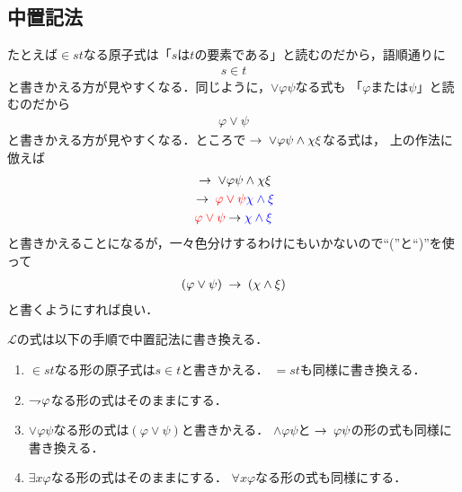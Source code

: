 \subsection{中置記法}
	たとえば$\in s t$なる原子式は「$s$は$t$の要素である」と読むのだから，語順通りに
	\begin{align}
		s \in t
	\end{align}
	と書きかえる方が見やすくなる．同じように，$\vee \varphi \psi$なる式も
	「$\varphi$または$\psi$」と読むのだから
	\begin{align}
		\varphi \vee \psi
	\end{align}
	と書きかえる方が見やすくなる．ところで$\hspace{0.25em}\rightarrow\hspace{0.25em} \vee \varphi \psi \wedge \chi \xi$なる式は，
	上の作法に倣えば
	\begin{align}
		\begin{gathered}
			\hspace{0.25em}\rightarrow\hspace{0.25em} \vee \varphi \psi \wedge \chi \xi \\
			\hspace{0.25em}\rightarrow\hspace{0.25em} \color{red}{\varphi \vee \psi} \color{blue}{\chi \wedge \xi} \\
			\color{red}{\varphi \vee \psi} \color{black}{\hspace{0.25em}\rightarrow\hspace{0.25em}} \color{blue}{\chi \wedge \xi}
		\end{gathered}
	\end{align}
	と書きかえることになるが，一々色分けするわけにもいかないので``(''と``)''を使って
	\begin{align}
		(\varphi \vee \psi) \hspace{0.25em}\rightarrow\hspace{0.25em} (\chi \wedge \xi)
	\end{align}
	と書くようにすれば良い．
	
	\begin{screen}
		\begin{metadfn}[中置記法]
			$\mathcal{L}$の式は以下の手順で中置記法に書き換える．
			\begin{enumerate}
				\item $\in s t$なる形の原子式は$s \in t$と書きかえる．
					$= s t$も同様に書き換える．
					
				\item $\rightharpoondown\hspace{-0.25em} \varphi$なる形の式はそのままにする．
				
				\item $\vee \varphi \psi$なる形の式は$(\varphi \vee \psi)$と書きかえる．
					$\wedge \varphi \psi$と$\hspace{0.25em}\rightarrow\hspace{0.25em} \varphi \psi$の形の式も同様に書き換える．
				
				\item $\exists x \varphi$なる形の式はそのままにする．
					$\forall x \varphi$なる形の式も同様にする．
			\end{enumerate}
		\end{metadfn}
	\end{screen}
	
